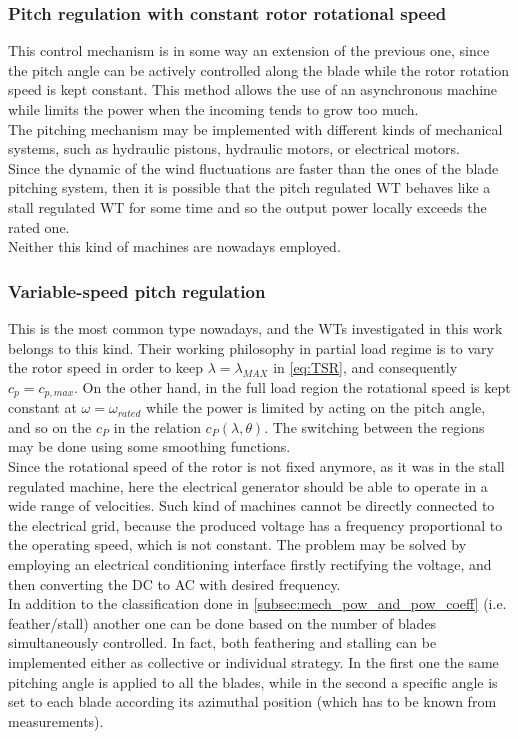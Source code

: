 \subsubsection{Pitch regulation with constant rotor rotational speed}
This control mechanism is in some way an extension of the previous one, since the pitch angle can be actively controlled along the blade while the rotor rotation speed is kept constant. This method allows the use of an asynchronous machine while limits the power when the incoming tends to grow too much. \\
 The pitching mechanism may be implemented with different kinds of mechanical systems, such as hydraulic pistons, hydraulic motors, or electrical motors. \\
Since the dynamic of the wind fluctuations are faster than the ones of the blade pitching system, then it is possible that the pitch regulated WT behaves like a stall regulated \acrshort{WT} for some time and so the output power locally exceeds the rated one.\\
Neither this kind of machines are nowadays employed.

\subsubsection{Variable-speed pitch regulation}
This is the most common type nowadays, and the \acrshort{WTs} investigated in this work belongs to this kind. Their working philosophy in partial load regime is to vary the rotor speed in order to keep $\lambda = \lambda_{MAX}$ in \autoref{eq:TSR}, and consequently $c_p=c_{p,max}$. On the other hand, in the full load region the rotational speed is kept constant at $\omega = \omega_{rated}$ while the power is limited by acting on the pitch angle, and so on the $c_P$ in the relation $c_P(\lambda, \theta)$. The switching between the regions may be done using some smoothing functions. \\
Since the rotational speed of the rotor is not fixed anymore, as it was in the stall regulated machine, here the electrical generator should be able to operate in a wide range of velocities. Such kind of machines cannot be directly connected to the electrical grid, because the produced voltage has a frequency proportional to the operating speed, which is not constant. The problem may be solved by employing an electrical conditioning interface firstly rectifying the voltage, and then converting the DC to AC with desired frequency. \\
In addition to the classification done in \ref{subsec:mech_pow_and_pow_coeff} (i.e. feather/stall) another one can be done based on the number of blades simultaneously controlled. In fact, both feathering and stalling can be implemented either as collective or individual strategy. In the first one the same pitching angle is applied to all the blades, while in the second a specific angle is set to each blade according its azimuthal position (which has to be known from measurements).

